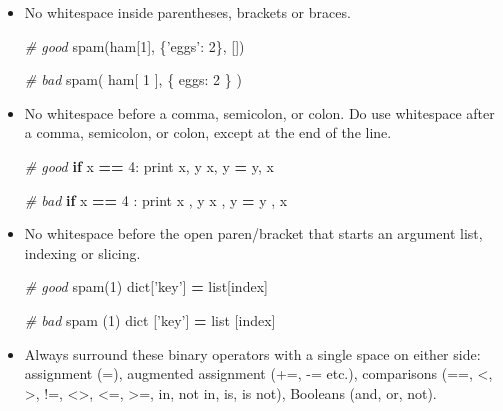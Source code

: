 \documentclass[
]{book}
\newenvironment{Shaded}{\begin{snugshade}}{\end{snugshade}}
\newcommand{\BuiltInTok}[1]{#1}
\newcommand{\CommentTok}[1]{\textcolor[rgb]{0.56,0.35,0.01}{\textit{#1}}}
\newcommand{\ControlFlowTok}[1]{\textcolor[rgb]{0.13,0.29,0.53}{\textbf{#1}}}
\newcommand{\DecValTok}[1]{\textcolor[rgb]{0.00,0.00,0.81}{#1}}
\newcommand{\NormalTok}[1]{#1}
\newcommand{\OperatorTok}[1]{\textcolor[rgb]{0.81,0.36,0.00}{\textbf{#1}}}
\newcommand{\StringTok}[1]{\textcolor[rgb]{0.31,0.60,0.02}{#1}}
\begin{document}
\begin{itemize}
\item
  No whitespace inside parentheses, brackets or braces.

\begin{Shaded}
\begin{Highlighting}[]
\CommentTok{# good}
\NormalTok{spam(ham[}\DecValTok{1}\NormalTok{], \{}\StringTok{'eggs'}\NormalTok{: }\DecValTok{2}\NormalTok{\}, [])}

\CommentTok{# bad}
\NormalTok{spam( ham[ }\DecValTok{1}\NormalTok{ ], \{ eggs: }\DecValTok{2}\NormalTok{ \} )}
\end{Highlighting}
\end{Shaded}
\item
  No whitespace before a comma, semicolon, or colon. Do use whitespace after a
  comma, semicolon, or colon, except at the end of the line.

\begin{Shaded}
\begin{Highlighting}[]
\CommentTok{# good}
\ControlFlowTok{if}\NormalTok{ x }\OperatorTok{==} \DecValTok{4}\NormalTok{: }
    \BuiltInTok{print}\NormalTok{ x, y}
\NormalTok{x, y }\OperatorTok{=}\NormalTok{ y, x}

\CommentTok{# bad}
\ControlFlowTok{if}\NormalTok{ x }\OperatorTok{==} \DecValTok{4}\NormalTok{ : }
    \BuiltInTok{print}\NormalTok{ x , y }
\NormalTok{x , y }\OperatorTok{=}\NormalTok{ y , x}
\end{Highlighting}
\end{Shaded}
\item
  No whitespace before the open paren/bracket that starts an argument list,
  indexing or slicing.

\begin{Shaded}
\begin{Highlighting}[]
\CommentTok{# good}
\NormalTok{spam(}\DecValTok{1}\NormalTok{)}
\BuiltInTok{dict}\NormalTok{[}\StringTok{'key'}\NormalTok{] }\OperatorTok{=} \BuiltInTok{list}\NormalTok{[index]}

\CommentTok{# bad}
\NormalTok{spam (}\DecValTok{1}\NormalTok{)}
\BuiltInTok{dict}\NormalTok{ [}\StringTok{'key'}\NormalTok{] }\OperatorTok{=} \BuiltInTok{list}\NormalTok{ [index]}
\end{Highlighting}
\end{Shaded}
\item
  Always surround these binary operators with a single space on either side:
  assignment (=), augmented assignment (+=, -= etc.), comparisons (==, \textless, \textgreater,
  !=, \textless\textgreater, \textless=, \textgreater=, in, not in, is, is not), Booleans (and, or, not).


\end{itemize}
\end{document}
